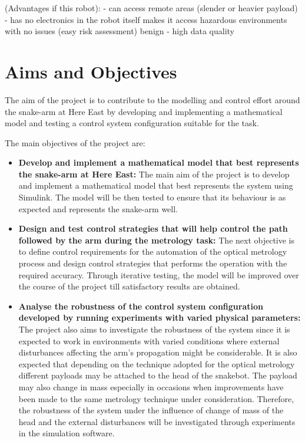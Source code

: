 \documentclass[a4paper,12pt]{report}
\begin{document}
(Advantages if this robot):
- can access remote areas (slender or heavier payload)
- has no electronics in the robot itself makes it access hazardous environments with no issues (easy risk assessment) benign 
- high data quality 

\section{Aims and Objectives}
The aim of the project is to contribute to the modelling and control effort around the snake-arm at Here East by developing and implementing a mathematical model and testing a control system configuration suitable for the task.

The main objectives of the project are:
\begin{itemize}
	\item \textbf{Develop and implement a mathematical model that best represents the snake-arm at Here East:} The main aim of the project is to develop and implement a mathematical model that best represents the system using Simulink. The model will be then tested to ensure that its behaviour is as expected and represents the snake-arm well.
	\item \textbf{Design and test control strategies that will help control the path followed by the arm during the metrology task:} The next objective is to define control requirements for the automation of the optical metrology process and design control strategies that performs the operation with the required accuracy. Through iterative testing, the model will be improved over the course of the project till satisfactory results are obtained.
	\item \textbf{Analyse the robustness of the control system configuration developed by running experiments with varied physical parameters:} The project also aims to investigate the robustness of the system since it is expected to work in environments with varied conditions where external disturbances affecting the arm’s propagation might be considerable. It is also expected that depending on the technique adopted for the optical metrology different payloads may be attached to the head of the snakebot. The payload may also change in mass especially in occasions when improvements have been made to the same metrology technique under consideration. Therefore, the robustness of the system under the influence of change of mass of the head and the external disturbances will be investigated through experiments in the simulation software.
\end{itemize}
\end{document}
